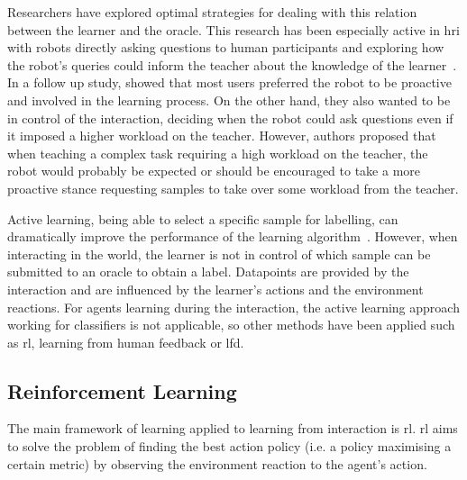 Researchers have explored optimal strategies for dealing with this relation between the learner and the oracle. This research has been especially active in \gls{hri} with robots directly asking questions to human participants and exploring how the robot's queries could inform the teacher about the knowledge of the learner~\citep{chao2010transparent}. In a follow up study, \cite{cakmak2010designing} showed that most users preferred the robot to be proactive and involved in the learning process. On the other hand, they also wanted to be in control of the interaction, deciding when the robot could ask questions even if it imposed a higher workload on the teacher. However, authors proposed that when teaching a complex task requiring a high workload on the teacher, the robot would probably be expected or should be encouraged to take a more proactive stance requesting samples to take over some workload from the teacher.

Active learning, being able to select a specific sample for labelling, can dramatically improve the performance of the learning algorithm~\citep{settles2012active}. However, when interacting in the world, the learner is not in control of which sample can be submitted to an oracle to obtain a label. Datapoints are provided by the interaction and are influenced by the learner's actions and the environment reactions. For agents learning during the interaction, the active learning approach working for classifiers is not applicable, so other methods have been applied such as \gls{rl}, learning from human feedback or \gls{lfd}.

\subsection{Reinforcement Learning} \label{ssec:back_rl}

The main framework of learning applied to learning from interaction is \acrfull{rl}. \gls{rl} aims to solve the problem of finding the best action policy (i.e. a policy maximising a certain metric) by observing the environment reaction to the agent's action.

